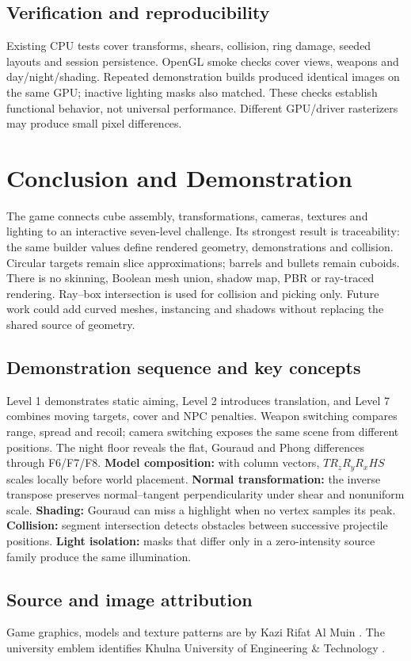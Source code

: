 \subsection{Verification and reproducibility}
Existing CPU tests cover transforms, shears, collision, ring damage, seeded layouts and session persistence. OpenGL smoke checks cover views, weapons and day/night/shading. Repeated demonstration builds produced identical images on the same GPU; inactive lighting masks also matched. These checks establish functional behavior, not universal performance. Different GPU/driver rasterizers may produce small pixel differences.
\section{Conclusion and Demonstration}
The game connects cube assembly, transformations, cameras, textures and lighting to an interactive seven-level challenge. Its strongest result is traceability: the same builder values define rendered geometry, demonstrations and collision. Circular targets remain slice approximations; barrels and bullets remain cuboids. There is no skinning, Boolean mesh union, shadow map, PBR or ray-traced rendering. Ray--box intersection is used for collision and picking only. Future work could add curved meshes, instancing and shadows without replacing the shared source of geometry.

\subsection{Demonstration sequence and key concepts}
Level 1 demonstrates static aiming, Level 2 introduces translation, and Level 7 combines moving targets, cover and NPC penalties. Weapon switching compares range, spread and recoil; camera switching exposes the same scene from different positions. The night floor reveals the flat, Gouraud and Phong differences through F6/F7/F8.
\textbf{Model composition:} with column vectors, $TR_zR_yR_xHS$ scales locally before world placement. \textbf{Normal transformation:} the inverse transpose preserves normal--tangent perpendicularity under shear and nonuniform scale. \textbf{Shading:} Gouraud can miss a highlight when no vertex samples its peak. \textbf{Collision:} segment intersection detects obstacles between successive projectile positions. \textbf{Light isolation:} masks that differ only in a zero-intensity source family produce the same illumination.
\subsection{Source and image attribution}
Game graphics, models and texture patterns are by Kazi Rifat Al Muin \cite{project}. The university emblem identifies Khulna University of Engineering \& Technology \cite{kuet}.



